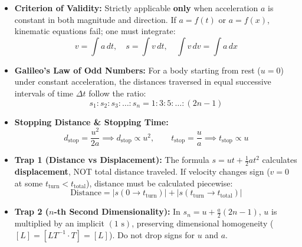 \documentclass[10pt,twoside,openright]{book}
\begin{document}
\begin{usecasebox}
\begin{itemize}
  \item \textbf{Criterion of Validity:} Strictly applicable \textbf{only} when acceleration $a$ is constant in both magnitude and direction. If $a = f(t)$ or $a = f(x)$, kinematic equations fail; one must integrate:
  \begin{equation*}
    v = \int a\,dt, \quad s = \int v\,dt, \quad \int v\,dv = \int a\,dx
  \end{equation*}
  \item \textbf{Galileo's Law of Odd Numbers:} For a body starting from rest ($u=0$) under constant acceleration, the distances traversed in equal successive intervals of time $\Delta t$ follow the ratio:
  \begin{equation*}
    s_1 : s_2 : s_3 : \dots : s_n = 1 : 3 : 5 : \dots : (2n - 1)
  \end{equation*}
  \item \textbf{Stopping Distance \& Stopping Time:}
  \begin{equation*}
    d_{\text{stop}} = \frac{u^2}{2a} \implies d_{\text{stop}} \propto u^2, \qquad t_{\text{stop}} = \frac{u}{a} \implies t_{\text{stop}} \propto u
  \end{equation*}
\end{itemize}
\end{usecasebox}

\begin{trapbox}
\begin{itemize}
  \item \textbf{Trap 1 (Distance vs Displacement):} The formula $s = ut + \frac{1}{2}at^2$ calculates \textbf{displacement}, NOT total distance traveled. If velocity changes sign ($v=0$ at some $t_{\text{turn}} < t_{\text{total}}$), distance must be calculated piecewise:
  \begin{equation*}
    \text{Distance} = |s(0 \to t_{\text{turn}})| + |s(t_{\text{turn}} \to t_{\text{total}})|
  \end{equation*}
  \item \textbf{Trap 2 ($n$-th Second Dimensionality):} In $s_n = u + \frac{a}{2}(2n-1)$, $u$ is multiplied by an implicit $(1\text{ s})$, preserving dimensional homogeneity ($[L] = [LT^{-1} \cdot T] = [L]$). Do not drop signs for $u$ and $a$.
\end{itemize}
\end{trapbox}
\end{document}
